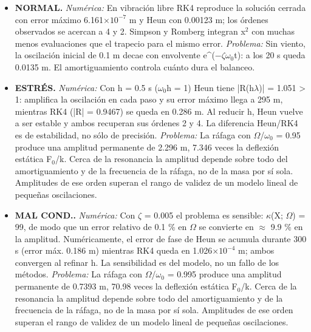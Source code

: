 \begin{itemize}
\item \textbf{NORMAL.} \emph{Numérica:} En vibración libre RK4 reproduce la solución cerrada con error máximo 6.161$\times10^{-7}$ m y Heun con 0.00123 m; los órdenes observados se acercan a 4 y 2. Simpson y Romberg integran x$^{2}$ con muchas menos evaluaciones que el trapecio para el mismo error. \emph{Problema:} Sin viento, la oscilación inicial de 0.1 m decae con envolvente e\^{}($-\zeta\omega_{0}$t): a los 20 s queda 0.0135 m. El amortiguamiento controla cuánto dura el balanceo.
\item \textbf{ESTRÉS.} \emph{Numérica:} Con h = 0.5 s ($\omega_{0}$h = 1) Heun tiene |R(h$\lambda$)| = 1.051 > 1: amplifica la oscilación en cada paso y su error máximo llega a 295 m, mientras RK4 (|R| = 0.9467) se queda en 0.286 m. Al reducir h, Heun vuelve a ser estable y ambos recuperan sus órdenes 2 y 4. La diferencia Heun/RK4 es de estabilidad, no sólo de precisión. \emph{Problema:} La ráfaga con $\Omega$/$\omega_{0}$ = 0.95 produce una amplitud permanente de 2.296 m, 7.346 veces la deflexión estática F$_{0}$/k. Cerca de la resonancia la amplitud depende sobre todo del amortiguamiento y de la frecuencia de la ráfaga, no de la masa por sí sola. Amplitudes de ese orden superan el rango de validez de un modelo lineal de pequeñas oscilaciones.
\item \textbf{MAL COND..} \emph{Numérica:} Con $\zeta$ = 0.005 el problema es sensible: $\kappa$(X; $\Omega$) = 99, de modo que un error relativo de 0.1 \% en $\Omega$ se convierte en $\approx$ 9.9 \% en la amplitud. Numéricamente, el error de fase de Heun se acumula durante 300 s (error máx. 0.186 m) mientras RK4 queda en 1.026$\times10^{-4}$ m; ambos convergen al refinar h. La sensibilidad es del modelo, no un fallo de los métodos. \emph{Problema:} La ráfaga con $\Omega$/$\omega_{0}$ = 0.995 produce una amplitud permanente de 0.7393 m, 70.98 veces la deflexión estática F$_{0}$/k. Cerca de la resonancia la amplitud depende sobre todo del amortiguamiento y de la frecuencia de la ráfaga, no de la masa por sí sola. Amplitudes de ese orden superan el rango de validez de un modelo lineal de pequeñas oscilaciones.
\end{itemize}

